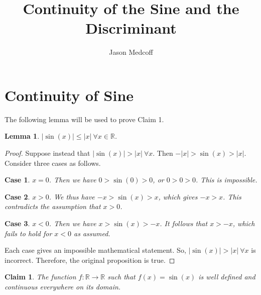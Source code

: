\documentclass[12pt]{amsart}
\title{Continuity of the Sine and the Discriminant}
\author{Jason Medcoff}
\newtheorem{lem}{Lemma}
\newtheorem{clm}{Claim}
\theoremstyle{case}
\newtheorem{case}{Case}
\begin{document}
	
	\maketitle
	
	\section{Continuity of Sine}
	
	The following lemma will be used to prove Claim 1.
	\begin{lem}
		\label{ineq}
		$|\sin(x)| \leq |x| \ \forall x \in \mathbb{R}$.
	\end{lem}

	\begin{proof}
		Suppose instead that $|\sin(x)| > |x| \ \forall x$. Then $ -|x| > \sin(x) > |x| $. Consider three cases as follows.
		\begin{case}
			$x=0$. Then we have $0 > \sin(0) > 0$, or $0>0>0$. This is impossible.
		\end{case}
		\begin{case}
			$x>0$. We thus have $-x>\sin(x)>x$, which gives $-x>x$. This contradicts the assumption that $x>0$.
		\end{case}
		\begin{case}
			$x<0$. Then we have $x>\sin(x)>-x$. It follows that $x>-x$, which fails to hold for $x<0$ as assumed.
		\end{case}
	
	Each case gives an impossible mathematical statement. So, $|\sin(x)| > |x| \ \forall x$ is incorrect. Therefore, the original proposition is true.		
	\end{proof}
	
	
	
	
	\begin{clm}
		The function $f : \mathbb{R} \to \mathbb{R}$ such that $f(x) = \sin(x)$ is well defined and continuous everywhere on its domain.
	\end{clm}
	
\end{document}
